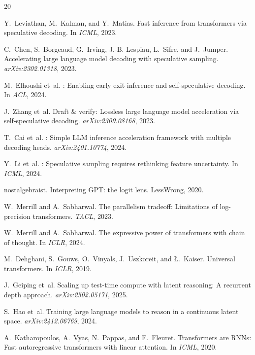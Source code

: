 \documentclass{article}
\theoremstyle{plain}
\theoremstyle{definition}
\begin{document}
\begin{thebibliography}{20}

Y.~Leviathan, M.~Kalman, and Y.~Matias.
\newblock Fast inference from transformers via speculative decoding.
\newblock In \emph{ICML}, 2023.

C.~Chen, S.~Borgeaud, G.~Irving, J.-B. Lespiau, L.~Sifre, and J.~Jumper.
\newblock Accelerating large language model decoding with speculative sampling.
\newblock \emph{arXiv:2302.01318}, 2023.

M.~Elhoushi et~al.
: Enabling early exit inference and self-speculative decoding.
\newblock In \emph{ACL}, 2024.

J.~Zhang et~al.
\newblock Draft \& verify: Lossless large language model acceleration via
  self-speculative decoding.
\newblock \emph{arXiv:2309.08168}, 2023.

T.~Cai et~al.
: Simple {LLM} inference acceleration framework with multiple
  decoding heads.
\newblock \emph{arXiv:2401.10774}, 2024.

Y.~Li et~al.
: Speculative sampling requires rethinking feature uncertainty.
\newblock In \emph{ICML}, 2024.

nostalgebraist.
\newblock Interpreting {GPT}: the logit lens.
\newblock LessWrong, 2020.

W.~Merrill and A.~Sabharwal.
\newblock The parallelism tradeoff: Limitations of log-precision transformers.
\newblock \emph{TACL}, 2023.

W.~Merrill and A.~Sabharwal.
\newblock The expressive power of transformers with chain of thought.
\newblock In \emph{ICLR}, 2024.

M.~Dehghani, S.~Gouws, O.~Vinyals, J.~Uszkoreit, and {\L}.~Kaiser.
\newblock Universal transformers.
\newblock In \emph{ICLR}, 2019.

J.~Geiping et~al.
\newblock Scaling up test-time compute with latent reasoning: A recurrent depth
  approach.
\newblock \emph{arXiv:2502.05171}, 2025.

S.~Hao et~al.
\newblock Training large language models to reason in a continuous latent space.
\newblock \emph{arXiv:2412.06769}, 2024.

A.~Katharopoulos, A.~Vyas, N.~Pappas, and F.~Fleuret.
\newblock Transformers are {RNNs}: Fast autoregressive transformers with linear
  attention.
\newblock In \emph{ICML}, 2020.


\end{thebibliography}
\end{document}
